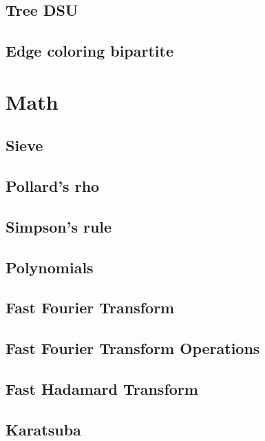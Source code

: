 \begin{multicols}{2}
\subsection{Tree DSU}

\subsection{Edge coloring bipartite}

\section{Math}

\subsection{Sieve}

\subsection{Pollard's rho}

\subsection{Simpson's rule}

\subsection{Polynomials}

\subsection{Fast Fourier Transform}

\subsection{Fast Fourier Transform Operations}

\subsection{Fast Hadamard Transform}

\subsection{Karatsuba}


\end{multicols}
